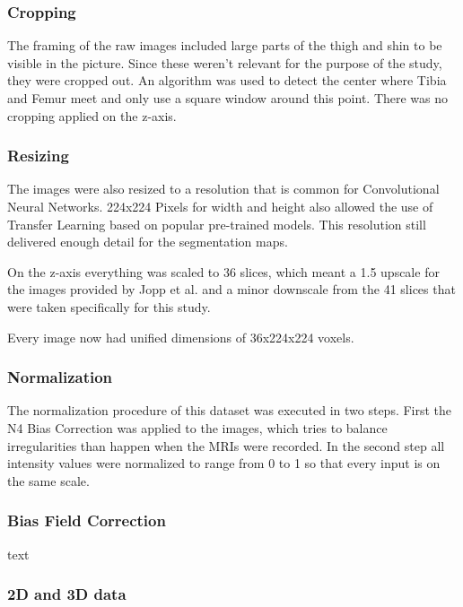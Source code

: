 \subsubsection{Cropping}

The framing of the raw images included large parts of the thigh and shin to be visible in the picture. Since these weren't relevant for the purpose of the study, they were cropped out. An algorithm was used to detect the center where Tibia and Femur meet and only use a square window around this point. There was no cropping applied on the z-axis.

\subsubsection{Resizing}

The images were also resized to a resolution that is common for Convolutional Neural Networks. 224x224 Pixels for width and height also allowed the use of Transfer Learning based on popular pre-trained models. This resolution still delivered enough detail for the segmentation maps.

On the z-axis everything was scaled to 36 slices, which meant a 1.5 upscale for the images provided by Jopp et al. and a minor downscale from the 41 slices that were taken specifically for this study.

Every image now had unified dimensions of 36x224x224 voxels.

\subsubsection{Normalization}

The normalization procedure of this dataset was executed in two steps. First the N4 Bias Correction was applied to the images, which tries to balance irregularities than happen when the MRIs were recorded. In the second step all intensity values were normalized to range from 0 to 1 so that every input is on the same scale.

\subsubsection{Bias Field Correction}

text

\subsubsection{2D and 3D data}

